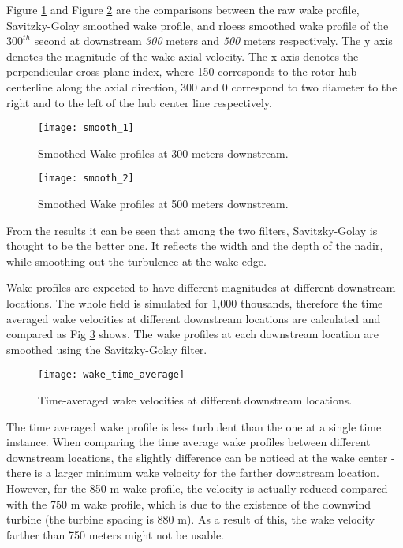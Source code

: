 \documentclass{umthesis}
\begin{document}
Figure \ref{fig:smooth_1} and Figure \ref{fig:smooth_2} are the comparisons between the raw wake profile, Savitzky-Golay smoothed wake profile, and rloess smoothed wake profile of the $300^{th}$ second at downstream \textit{300} meters and \textit{500} meters respectively. The y axis denotes the magnitude of the wake axial velocity. The x axis denotes the perpendicular cross-plane index, where 150 corresponds to the rotor hub centerline along the axial direction, 300 and 0 correspond to two diameter to the right and to the left of the hub center line respectively.

\begin{figure}
  \centering
  \texttt{[image: smooth\_1]}
  \caption{Smoothed Wake profiles at 300 meters downstream.}\label{fig:smooth_1}
\end{figure}

\begin{figure}
  \centering
  \texttt{[image: smooth\_2]}
  \caption{Smoothed Wake profiles at 500 meters downstream.}\label{fig:smooth_2}
\end{figure}

From the results it can be seen that among the two filters, Savitzky-Golay is thought to be the better one. It reflects the width and the depth of the nadir, while smoothing out the turbulence at the wake edge. 

Wake profiles are expected to have different magnitudes at different downstream locations. The whole field is simulated for 1,000 thousands, therefore the time averaged wake velocities at different downstream locations are calculated and compared as Fig  \ref{fig:wake_time_average} shows. The wake profiles at each downstream location are smoothed using the Savitzky-Golay filter. 

\begin{figure}
  \centering
  \texttt{[image: wake\_time\_average]}
  \caption{Time-averaged wake velocities at different downstream locations.}\label{fig:wake_time_average}
\end{figure}

The time averaged wake profile is less turbulent than the one at a single time instance. When comparing the time average wake profiles between different downstream locations, the slightly difference can be noticed at the wake center - there is a larger minimum wake velocity for the farther downstream location. However, for the 850 m wake profile, the velocity is actually reduced compared with the 750 m wake profile, which is due to the existence of the downwind turbine (the turbine spacing is 880 m). As a result of this, the wake velocity farther than 750 meters might not be usable.
\end{document}
